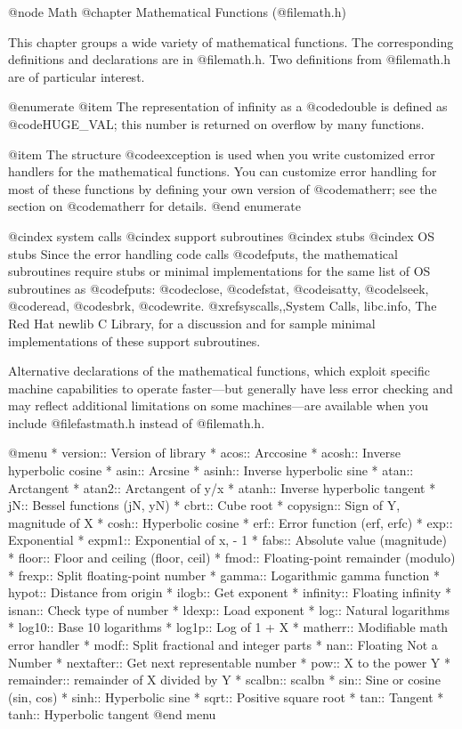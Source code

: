 @node Math
@chapter Mathematical Functions (@file{math.h})

This chapter groups a wide variety of mathematical functions.  The
corresponding definitions and declarations are in @file{math.h}.  
Two definitions from @file{math.h} are of particular interest.  

@enumerate
@item
The representation of infinity as a @code{double} is defined as
@code{HUGE_VAL}; this number is returned on overflow by many functions.

@item
The structure @code{exception} is used when you write customized error
handlers for the mathematical functions.  You can customize error
handling for most of these functions by defining your own version of
@code{matherr}; see the section on @code{matherr} for details.
@end enumerate

@cindex system calls
@cindex support subroutines
@cindex stubs
@cindex OS stubs
Since the error handling code calls @code{fputs}, the mathematical
subroutines require stubs or minimal implementations for the same list
of OS subroutines as @code{fputs}: @code{close}, @code{fstat},
@code{isatty}, @code{lseek}, @code{read}, @code{sbrk}, @code{write}.
@xref{syscalls,,System Calls, libc.info, The Red Hat newlib C Library},
for a discussion and for sample minimal implementations of these support
subroutines.

Alternative declarations of the mathematical functions, which exploit
specific machine capabilities to operate faster---but generally have
less error checking and may reflect additional limitations on some
machines---are available when you include @file{fastmath.h} instead of
@file{math.h}.

@menu 
* version::	Version of library
* acos::	Arccosine
* acosh::	Inverse hyperbolic cosine
* asin::	Arcsine
* asinh::	Inverse hyperbolic sine
* atan::	Arctangent
* atan2::	Arctangent of y/x
* atanh::	Inverse hyperbolic tangent
* jN::	        Bessel functions  (jN, yN)
* cbrt::	Cube root
* copysign::	Sign of Y, magnitude of X
* cosh::	Hyperbolic cosine
* erf::		Error function  (erf, erfc)
* exp::		Exponential
* expm1::	Exponential of x, - 1
* fabs::	Absolute value (magnitude)
* floor::	Floor and ceiling  (floor, ceil)
* fmod::	Floating-point remainder (modulo)
* frexp::	Split floating-point number
* gamma::	Logarithmic gamma function
* hypot::	Distance from origin
* ilogb::	Get exponent
* infinity::	Floating infinity
* isnan::	Check type of number
* ldexp::	Load exponent
* log::		Natural logarithms
* log10::	Base 10 logarithms
* log1p::	Log of 1 + X
* matherr::	Modifiable math error handler
* modf::	Split fractional and integer parts
* nan::		Floating Not a Number
* nextafter::	Get next representable number
* pow::		X to the power Y
* remainder::	remainder of X divided by Y 
* scalbn::	scalbn
* sin::		Sine or cosine (sin, cos)
* sinh::	Hyperbolic sine
* sqrt::	Positive square root
* tan::		Tangent
* tanh::	Hyperbolic tangent
@end menu

